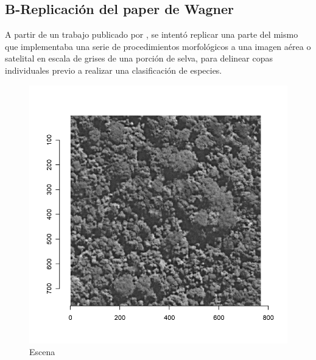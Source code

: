 \subsection{B-Replicación del paper de Wagner}
A partir de un trabajo publicado por \cite{hubert_wagner_individual_2018}, se intentó replicar una parte del mismo que implementaba una serie de procedimientos morfológicos a una imagen aérea o satelital en escala de grises de una porción de selva, para delinear copas individuales previo a realizar una clasificación de especies.

\begin{figure}
    \includegraphics[width=\textwidth]{Imagenes/Resultados script morfologico/output_10_0.png}
     \hfill
     \caption{Escena }
    \label{morfologico_entrada}
\end{figure}

